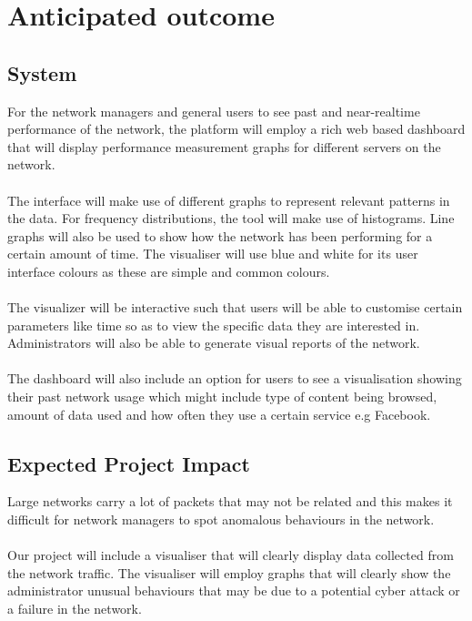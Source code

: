 \section{Anticipated outcome}
\subsection{System}
For the network managers and general users to see past and near-realtime performance of the network, the platform will employ a rich web based dashboard that will display performance measurement graphs for different servers on the network.
\paragraph{}
The interface will make use of different graphs to represent relevant patterns in the data. For frequency distributions, the tool will make use of histograms. Line graphs will also be used to show how the network has been performing for a certain amount of time. The visualiser will use blue and white for its user interface colours as these are simple and common colours.
\paragraph{}
The visualizer will be interactive such that users will be able to customise certain parameters like time so as to view the specific data they are interested in. Administrators will also be able to generate visual reports of the network.
\paragraph{}
The dashboard will also include an option for users to see a visualisation showing their past network usage which might include type of content being browsed, amount of data used and how often they use a certain service e.g Facebook.

\subsection{Expected Project Impact}
Large networks carry a lot of packets that may not be related and this makes it difficult for network managers to spot anomalous behaviours in the network\cite{Ruan2018}.
\paragraph{}
Our project will include a visualiser that will clearly display data collected from the network traffic. The visualiser will employ graphs that will clearly show the administrator unusual behaviours that may be due to a potential cyber attack or a failure in the network.

